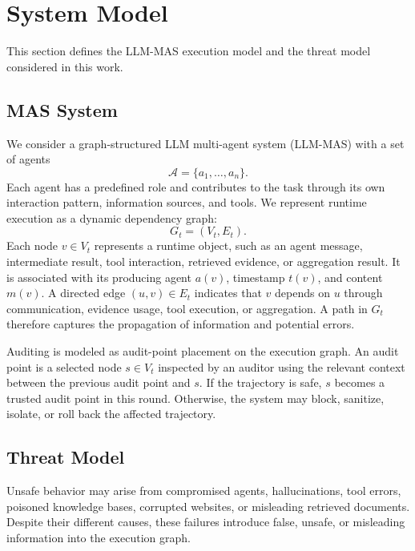 \documentclass[letterpaper]{article} %
\begin{document}
\section{System Model}
\label{system model}

This section defines the LLM-MAS execution model and the threat model considered in this work.

\subsection{MAS System}

We consider a graph-structured LLM multi-agent system (LLM-MAS) with a set of agents
\begin{equation}
\mathcal{A}=\{a_1,\ldots,a_n\}.
\end{equation}
Each agent has a predefined role and contributes to the task through its own interaction pattern, information sources, and tools. We represent runtime execution as a dynamic dependency graph:
\begin{equation}
G_t=(V_t,E_t).
\end{equation}
Each node \(v\in V_t\) represents a runtime object, such as an agent message, intermediate result, tool interaction, retrieved evidence, or aggregation result. It is associated with its producing agent \(a(v)\), timestamp \(t(v)\), and content \(m(v)\). A directed edge \((u,v)\in E_t\) indicates that \(v\) depends on \(u\) through communication, evidence usage, tool execution, or aggregation. A path in \(G_t\) therefore captures the propagation of information and potential errors.

Auditing is modeled as audit-point placement on the execution graph. An audit point is a selected node \(s\in V_t\) inspected by an auditor using the relevant context between the previous audit point and \(s\). If the trajectory is safe, \(s\) becomes a trusted audit point in this round. Otherwise, the system may block, sanitize, isolate, or roll back the affected trajectory.

\subsection{Threat Model}

Unsafe behavior may arise from compromised agents, hallucinations, tool errors, poisoned knowledge bases, corrupted websites, or misleading retrieved documents. Despite their different causes, these failures introduce false, unsafe, or misleading information into the execution graph.
\end{document}
